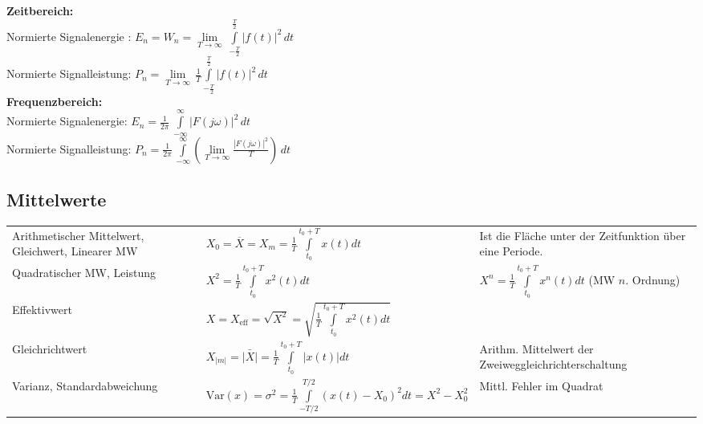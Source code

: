 \begin{multicols}{2}
 \textbf{Zeitbereich:} \\
 Normierte Signalenergie : $E_n = W_n = \lim\limits_{T\to\infty}\,\int\limits_{-\frac{T}{2}}^\frac{T}{2}|f(t)|^2\,dt$ \\
 Normierte Signalleistung: $P_n = \lim\limits_{T\to\infty}\,
 \frac{1}{T}\int\limits_{-\frac{T}{2}}^\frac{T}{2}|f(t)|^2\,dt$ \\
 \textbf{Frequenzbereich:} \\
 Normierte Signalenergie: $E_n = \frac{1}{2\pi}\,\int\limits_{-\infty}^\infty|F(j\omega)|^2\,dt$ \\
 Normierte Signalleistung: $P_n = \frac{1}{2\pi}\,\int\limits_{-\infty}^\infty\left(
 \lim\limits_{T\to\infty}\frac{|F(j\omega)|^2}{T}\right)\,dt$
\end{multicols}


\subsection{Mittelwerte }
\begin{tabular}{p{4.6cm}p{7.4cm}p{6cm}}
	Arithmetischer Mittelwert, Gleichwert, Linearer MW &
	$X_0 = \overline{X} = X_m = \frac {1} {T} \int\limits_{t_0}^{t_0+T} x(t)dt$ &
	Ist die Fläche unter der Zeitfunktion über eine Periode.
    \\
	Quadratischer MW, Leistung &
	$X^2 = \frac {1} {T} \int\limits_{t_0}^{t_0+T} x^2(t)dt$ & 
	$X^n = \frac {1} {T} \int\limits_{t_0}^{t_0+T} x^n(t)dt$ (MW $n$. Ordnung) 
	\\
	Effektivwert &
	$X = X_{\text{eff}}= \sqrt{X^2} = \sqrt{\frac{1}{T} \int\limits ^{t_0+T} _{t_0}{x^2(t)dt}}$
	& 
	\\
	Gleichrichtwert &
	$X_{|m|} = \bar{|X|} = \frac{1}{T} \int\limits_{t_0}^{t_0+T}{|x(t)| dt}$ &
    Arithm. Mittelwert der Zweiweggleichrichterschaltung
    \\
	Varianz, Standardabweichung	&
	$\text{Var}(x)=\sigma^2= \frac {1} {T} \int\limits_{-T/2}^{T/2}(x(t)-X_0)^2dt = X^2-X_0^2$ &
	Mittl. Fehler im Quadrat
	\\
\end{tabular}


\newpage
